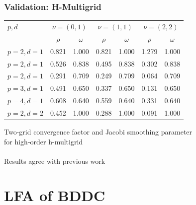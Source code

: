 \documentclass{beamer}
\begin{document}
\begin{frame}
\begin{center}
\frametitle{Validation: H-Multigrid}

\begin{table}[ht!]
\begin{center}
\begin{tabular}{l cc cc cc}
  \toprule
  $p, d$  &  \multicolumn{2}{c}{$\nu = \left( 0, 1 \right)$}  &  \multicolumn{2}{c}{$\nu = \left( 1, 1 \right)$}  &  \multicolumn{2}{c}{$\nu = \left( 2, 2 \right)$}  \\
                      &  $\rho$  &  $\omega$  &  $\rho$ & $\omega$  &  $\rho$ & $\omega$  \\
  \toprule
  $p = 2, d = 1$  &  0.821 & 1.000  &  0.821 & 1.000  &  1.279 & 1.000   \\
  $p = 2, d = 1$  &  0.526 & 0.838  &  0.495 & 0.838  &  0.302 & 0.838   \\
  $p = 2, d = 1$  &  0.291 & 0.709  &  0.249 & 0.709  &  0.064 & 0.709   \\
  \midrule
  $p = 3, d = 1$  &  0.491 & 0.650  &  0.337 & 0.650  &  0.131 & 0.650   \\
  \midrule
  $p = 4, d = 1$  &  0.608 & 0.640  &  0.559 & 0.640  &  0.331 & 0.640   \\
  \midrule
  $p = 2, d = 2$  &  0.452 & 1.000  &  0.288 & 1.000  &  0.091 & 1.000   \\
  \bottomrule
\end{tabular}
\end{center}
\label{table:two_grid_hmultigrid}
\end{table}

Two-grid convergence factor and Jacobi smoothing parameter\\for high-order h-multigrid\\

~\\

Results agree with previous work \cite{he2020two}\\

\end{center}
\end{frame}

\section{LFA of BDDC}
\end{document}
